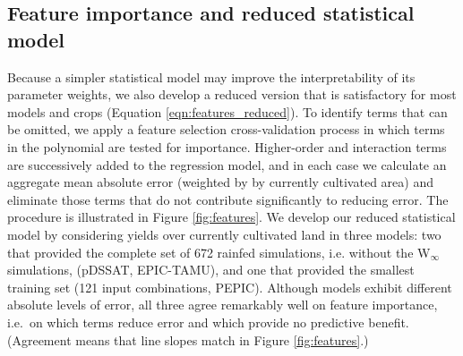 \documentclass[gmdd]{copernicus} %
\begin{document}
\subsection{Feature importance and reduced statistical model}
\label{sec:features}

Because a simpler statistical model may improve the interpretability of its parameter weights, we also develop a reduced version that is satisfactory for most models and crops (Equation \ref{eqn:features_reduced}).
To identify terms that can be omitted, we apply a feature selection cross-validation process in which terms in the polynomial are tested for importance. 
Higher-order and interaction terms are successively added to the regression model, and in each case we calculate an aggregate mean absolute error (weighted by by currently cultivated area) and eliminate those terms that do not contribute significantly to reducing error. 
The procedure is illustrated in Figure \ref{fig:features}. We develop our reduced statistical model by considering yields over currently cultivated land in three models: two that provided the complete set of 672 rainfed simulations, i.e. without the W$_{\infty}$ simulations,  (pDSSAT, EPIC-TAMU), and one that provided the smallest training set (121 input combinations, PEPIC).
Although models exhibit different absolute levels of error, all three agree remarkably well on feature importance, i.e.\ on which terms reduce error and which provide no predictive benefit. (Agreement means that line slopes match in Figure \ref{fig:features}.) 
 
\end{document}

